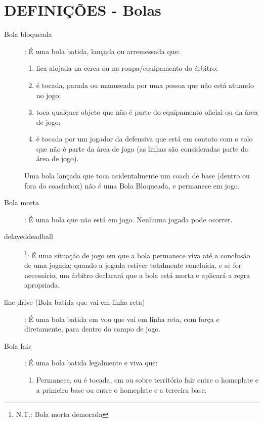 	\section{DEFINI\c{C}\~OES - Bolas}
	\begin{description}	
	\item[Bola bloqueada]: \'E uma bola batida, lan\c{c}ada ou arremessada que: 
	
	\begin{enumerate}[label=\alph*)]
		\item fica alojada na cerca ou na roupa/equipamento do \'arbitro; 
		
		\item  \'e tocada, parada ou manuseada por uma pessoa que n\~ao est\'a atuando no jogo; 
		
		\item  toca qualquer objeto que n\~ao \'e parte do equipamento oficial ou da \'area de jogo; 
		
		\item  \'e tocada por um jogador da defensiva que est\'a em contato com o solo que n\~ao \'e parte da \'area de jogo (as linhas s\~ao consideradas parte da \'area de jogo).
		
	\end{enumerate}
	Uma bola lan\c{c}ada que toca acidentalmente um \gls{coach} de base (dentro ou fora do \gls{coachsbox}) n\~ao \'e uma Bola Bloqueada, e permanece em jogo. 
	
	\item[Bola morta]: \'E uma bola que n\~ao est\'a em jogo. Nenhuma jogada pode ocorrer. 
	
	\item[\Gls{delayeddeadball}]\footnote{N.T.: Bola morta demorada}: \'E uma situa\c{c}\~ao de jogo em que a bola permanece viva at\'e a conclus\~ao de uma jogada; quando a jogada estiver totalmente conclu\'ida, e se for necess\'ario, um \'arbitro declarar\'a que a bola est\'a morta e aplicar\'a a regra apropriada. 
	
	\item[\gls{line drive} (Bola batida que vai em linha reta)]: \'E uma bola batida em voo que vai em linha reta, com for\c{c}a e diretamente, para dentro do campo de jogo. 
	
	\item[Bola \gls{fair}]: \'E uma bola batida legalmente e viva que: 
	
	\begin{enumerate}[label=\alph*)]
		\item Permanece, ou \'e tocada, em ou sobre territ\'orio \gls{fair} entre o \gls{homeplate} e a primeira base ou entre o \gls{homeplate} e a terceira base. 
		

\end{enumerate}
\end{description}
